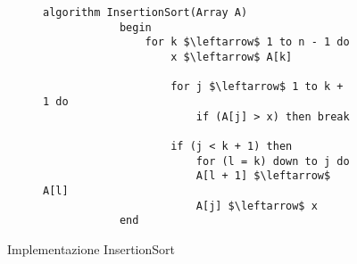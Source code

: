 \documentclass{subfiles}
\begin{document}
\begin{figure*}[!h]
    \centering
    \begin{subfigure}[b]{0.5\textwidth}
        \begin{lstlisting}[language = algol]
            algorithm InsertionSort(Array A)
            begin
                for k $\leftarrow$ 1 to n - 1 do 
                    x $\leftarrow$ A[k]

                    for j $\leftarrow$ 1 to k + 1 do
                        if (A[j] > x) then break

                    if (j < k + 1) then
                        for (l = k) down to j do 
                        A[l + 1] $\leftarrow$ A[l]
                        A[j] $\leftarrow$ x
            end
        \end{lstlisting}
    \end{subfigure}
    \caption{Implementazione InsertionSort}
\end{figure*}
\end{document}
